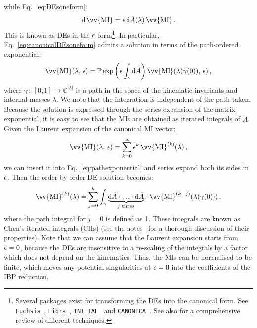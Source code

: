 \documentclass[main.tex]{subfiles}
\begin{document}
while Eq.~\ref{eq:DEsoneform}:
\begin{equation} \label{eq:canonicalDEsoneform}
    \dd \,\vv{\text{MI}} = \eps \, \dd \tilde{A}(\lambda) \,\vv{\text{MI}}\,.
\end{equation}
This is known as DEs in the $\epsilon$-form\footnote{Several packages exist for transforming the DEs into the canonical form. See \texttt{Fuchsia}~\cite{Gituliar:2017vzm}, \texttt{Libra}~\cite{Lee:2020zfb}, \texttt{INITIAL}~\cite{Dlapa:2020cwj} and \texttt{CANONICA}~\cite{Meyer:2018feh}. See also \cite{Dlapa:2022nct} for a comprehensive review of different techniques.}. In particular, Eq.~\ref{eq:canonicalDEsoneform} admits a solution in terms of the path-ordered exponential:
\begin{equation} \label{eq:pathexponential}
    \vv{\text{MI}}(\lambda,\, \eps) = \mathbb{P} \exp \left(\eps\int_\gamma \dd \tilde{A} \right) \vv{\text{MI}}(\lambda(\gamma(0)),\,\eps )\,,
\end{equation}
where $\gamma\,:\,[0, 1] \rightarrow \mathbb{C}^{|\lambda|}$ is a path in the space of the kinematic invariants and internal masses $\lambda$. We note that the integration is independent of the path taken. Because the solution is expressed through the series expansion of the matrix exponential, it is easy to see that the MIs are obtained as iterated integrals of $\tilde{A}$. Given the Laurent expansion of the canonical MI vector:
\begin{equation} \label{eq:MIlaurentexp}
    \vv{\text{MI}}(\lambda, \, \eps) = \sum_{k=0}^\infty \eps^k\,\vv{\text{MI}}^{(k)}(\lambda) \,,
\end{equation}
we can insert it into Eq.~\ref{eq:pathexponential} and series expand both its sides in $\epsilon$. Then the order-by-order DE solution becomes:
\begin{equation} \label{eq:DEssolution}
    \vv{\text{MI}}^{(k)}(\lambda) = \sum_{j=0}^k \int_\gamma \underbrace{\dd \tilde{A} \cdot \ldots \cdot \dd \tilde{A}}_{j\text{ times}} \, \cdot \, \vv{\text{MI}}^{(k-j)}(\lambda(\gamma(0)))\,,
\end{equation}
where the path integral for $j=0$ is defined as 1\cite{Chen:1977oja}. These integrals are known as Chen's iterated integrals (CIIs) (see the notes~\cite{Brown:2013qva} for a thorough discussion of their properties). Note that we can assume that the Laurent expansion starts from $\epsilon=0$, because the DEs are insensitive to a re-scaling of the integrals by a factor which does not depend on the kinematics. Thus, the MIs can be normalised to be finite, which moves any potential singularities at $\epsilon=0$ into the coefficients of the IBP reduction. 
\end{document}
